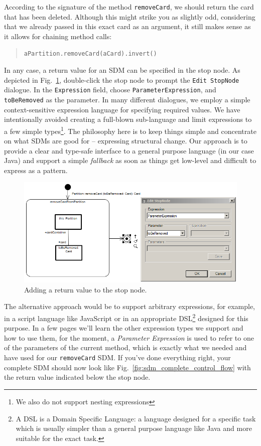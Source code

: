 According to the signature of the method \texttt{removeCard}, we should return the card that has been deleted.  
Although this might strike you as slightly odd, considering that we already passed in this exact card as an argument, it still makes sense as it allows for chaining method calls: \begin{quote}\texttt{aPartition.removeCard(aCard).invert()}\end{quote}
In any case, a return value for an SDM can be specified in the stop node.
As depicted in Fig.~\ref{fig:stop_node_return_value}, double-click the stop node to prompt the \texttt{Edit StopNode} dialogue.
In the \texttt{Expression} field, choose \texttt{ParameterExpression}, and \texttt{toBeRemoved} as the parameter.  
In many different dialogues, we employ a simple context-sensitive expression language for specifying required values.  
We have intentionally avoided creating a full-blown sub-language and limit expressions to a few simple types\footnote{We also do not support nesting expressions}.  
The philosophy here is to keep things simple and concentrate on what SDMs are good for -- expressing structural change.  
Our approach is to provide a clear and type-safe interface to a general purpose language (in our case Java) and support a simple \emph{fallback} as soon as things get low-level and difficult to express as a pattern.  

\begin{figure}[htp]
\begin{center}
  \includegraphics[width=\textwidth]{pics/sdmBilder/removeCard/sdm14RAW}
  \caption{Adding a return value to the stop node.}  
  \label{fig:stop_node_return_value}
\end{center}
\end{figure}

The alternative approach would be to support arbitrary expressions, for example, in a script language like JavaScript or in an appropriate DSL\footnote{A DSL is a Domain Specific Language: a language designed for a specific task which is usually simpler than a general purpose language like Java and more suitable for the exact task.} designed for this purpose. 
In a few pages we'll learn the other expression types
we support and how to use them, for the moment, a \emph{Parameter Expression} is used to refer to one of the parameters of the current method, which is exactly what we needed and have used for our \texttt{removeCard} SDM.
If you've done everything right, your complete SDM should now look like Fig.~\ref{fig:sdm_complete_control_flow} with the return value indicated below the stop node.

